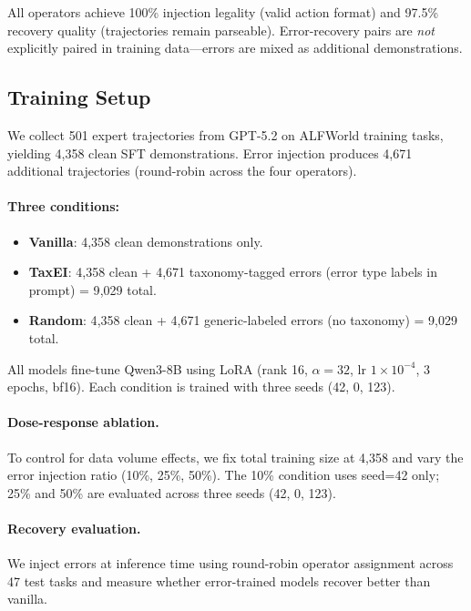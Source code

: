 All operators achieve 100\% injection legality (valid action format) and 97.5\% recovery quality (trajectories remain parseable). Error-recovery pairs are \emph{not} explicitly paired in training data---errors are mixed as additional demonstrations.

\subsection{Training Setup}
\label{sec:training_setup}

We collect 501 expert trajectories from GPT-5.2 on ALFWorld training tasks, yielding 4{,}358 clean SFT demonstrations. Error injection produces 4{,}671 additional trajectories (round-robin across the four operators).

\paragraph{Three conditions:}
\begin{itemize}[nosep,leftmargin=*]
\item \textbf{Vanilla}: 4{,}358 clean demonstrations only.
\item \textbf{TaxEI}: 4{,}358 clean + 4{,}671 taxonomy-tagged errors (error type labels in prompt) = 9{,}029 total.
\item \textbf{Random}: 4{,}358 clean + 4{,}671 generic-labeled errors (no taxonomy) = 9{,}029 total.
\end{itemize}

All models fine-tune Qwen3-8B using LoRA (rank 16, $\alpha{=}32$, lr $1{\times}10^{-4}$, 3 epochs, bf16). Each condition is trained with three seeds (42, 0, 123).

\paragraph{Dose-response ablation.} To control for data volume effects, we fix total training size at 4{,}358 and vary the error injection ratio (10\%, 25\%, 50\%). The 10\% condition uses seed=42 only; 25\% and 50\% are evaluated across three seeds (42, 0, 123).

\paragraph{Recovery evaluation.} We inject errors at inference time using round-robin operator assignment across 47 test tasks and measure whether error-trained models recover better than vanilla.